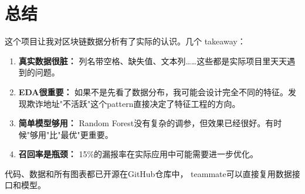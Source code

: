 \documentclass[12pt,a4paper]{article}
\begin{document}
\section{总结}

这个项目让我对区块链数据分析有了实际的认识。几个 takeaway：

\begin{enumerate}
    \item \textbf{真实数据很脏：} 列名带空格、缺失值、文本列……这些都是实际项目里天天遇到的问题。
    \item \textbf{EDA很重要：} 如果不是先看了数据分布，我可能会设计完全不同的特征。发现欺诈地址"不活跃"这个pattern直接决定了特征工程的方向。
    \item \textbf{简单模型够用：} Random Forest没有复杂的调参，但效果已经很好。有时候"够用"比"最优"更重要。
    \item \textbf{召回率是瓶颈：} 15\%的漏报率在实际应用中可能需要进一步优化。
\end{enumerate}

代码、数据和所有图表都已开源在GitHub仓库中， teammate可以直接复用数据接口和模型。
\end{document}
